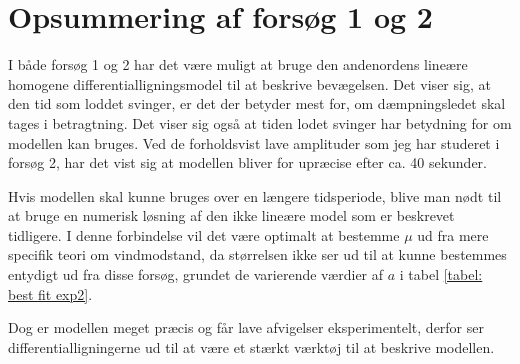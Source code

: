 \section{Opsummering af forsøg 1 og 2}
I både forsøg 1 og 2 har det være muligt at bruge den andenordens lineære homogene differentialligningsmodel til at beskrive bevægelsen. 
Det viser sig, at den tid som loddet svinger, er det der betyder mest for, om dæmpningsledet skal tages i betragtning. 
Det viser sig også at tiden lodet svinger har betydning for om modellen kan bruges. 
Ved de forholdsvist lave amplituder som jeg har studeret i forsøg 2, har det vist sig at modellen bliver for upræcise efter ca. 40 sekunder. 

Hvis modellen skal kunne bruges over en længere tidsperiode, blive man nødt til at bruge en numerisk løsning af den ikke lineære model som er beskrevet tidligere.
I denne forbindelse vil det være optimalt at bestemme $\mu$ ud fra mere specifik teori om vindmodstand, da størrelsen ikke ser ud til at kunne bestemmes entydigt ud fra disse forsøg, grundet de varierende værdier af $a$ i tabel \ref{tabel: best fit exp2}.

Dog er modellen meget præcis og får lave afvigelser eksperimentelt, derfor ser differentialligningerne ud til at være et stærkt værktøj til at beskrive modellen. 
